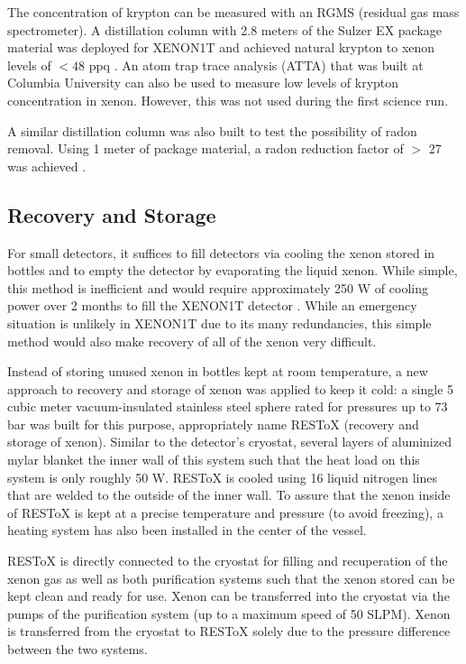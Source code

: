  The concentration of krypton can be measured with an RGMS (residual gas mass spectrometer).  A distillation column with 2.8 meters of the Sulzer EX package material was deployed for XENON1T and achieved natural krypton to xenon levels of $< 48$ ppq \cite{aprile2017removing}.  An atom trap trace analysis (ATTA) that was built at Columbia University \cite{aprile2013atom} can also be used to measure low levels of krypton concentration in xenon.  However, this was not used during the first science run.
 
 A similar distillation column was also built to test the possibility of radon removal.  Using 1 meter of package material, a radon reduction factor of $>$ 27 was achieved \cite{aprile2017online}.
 
 
  \subsection{Recovery and Storage}
 
 For small detectors, it suffices to fill detectors via cooling the xenon stored in bottles and to empty the detector by evaporating the liquid xenon.  While simple, this method is inefficient and would require approximately 250 W of cooling power over 2 months to fill the XENON1T detector \cite{aprile2017xenon1t}.  While an emergency situation is unlikely in XENON1T due to its many redundancies, this simple method would also make recovery of all of the xenon very difficult.
 
 Instead of storing unused xenon in bottles kept at room temperature, a new approach to recovery and storage of xenon was applied to keep it cold: a single 5 cubic meter vacuum-insulated stainless steel sphere rated for pressures up to 73 bar was built for this purpose, appropriately name RESToX (recovery and storage of xenon).  Similar to the detector's cryostat, several layers of aluminized mylar blanket the inner wall of this system such that the heat load on this system is only roughly 50 W.  RESToX is cooled using 16 liquid nitrogen lines that are welded to the outside of the inner wall.  To assure that the xenon inside of RESToX is kept at a precise temperature and pressure (to avoid freezing), a heating system has also been installed in the center of the vessel.
 
 RESToX is directly connected to the cryostat for filling and recuperation of the xenon gas as well as both purification systems such that the xenon stored can be kept clean and ready for use.  Xenon can be transferred into the cryostat via the pumps of the purification system (up to a maximum speed of 50 SLPM). Xenon is transferred from the cryostat to RESToX solely due to the pressure difference between the two systems.
 
